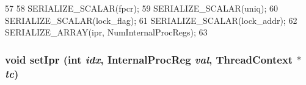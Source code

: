 \begin{DoxyCode}
57 {
58     SERIALIZE_SCALAR(fpcr);
59     SERIALIZE_SCALAR(uniq);
60     SERIALIZE_SCALAR(lock_flag);
61     SERIALIZE_SCALAR(lock_addr);
62     SERIALIZE_ARRAY(ipr, NumInternalProcRegs);
63 }
\end{DoxyCode}
\hypertarget{classAlphaISA_1_1ISA_a5ad670d8483b30ac29ecc133e3e501d5}{
\subsubsection[{setIpr}]{\setlength{\rightskip}{0pt plus 5cm}void setIpr (int {\em idx}, \/  {\bf InternalProcReg} {\em val}, \/  {\bf ThreadContext} $\ast$ {\em tc})}}
\label{classAlphaISA_1_1ISA_a5ad670d8483b30ac29ecc133e3e501d5}




